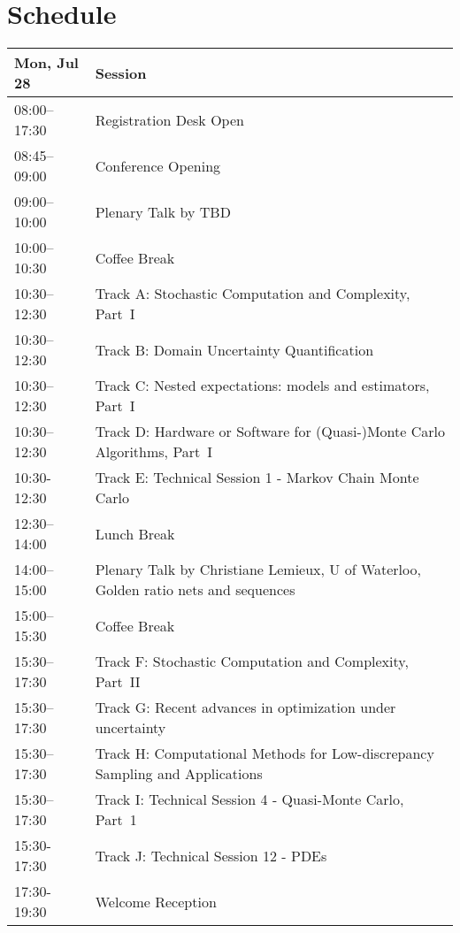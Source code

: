 \chapter{Schedule}
\begin{table}
{\footnotesize
\begin{tabularx}{\textwidth}{>{\hsize=0.32\hsize}X|>{\hsize=1.7\hsize}X}
\hline
\textbf{Mon, Jul 28} & \textbf{Session} \\
\hline
\cellcolor{\EmptyColor}08:00–17:30 & \cellcolor{\EmptyColor}Registration Desk Open \\
\cellcolor{\PlenaryColor}08:45–09:00 & \cellcolor{\PlenaryColor}Conference Opening \\
\cellcolor{\PlenaryColor}09:00–10:00 & \cellcolor{\PlenaryColor}Plenary Talk by TBD \\
\cellcolor{\EmptyColor}10:00–10:30 & \cellcolor{\EmptyColor}Coffee Break \\
\cellcolor{\SessionTitleColor}10:30–12:30 & \cellcolor{\SessionTitleColor}Track A: Stochastic Computation and Complexity, Part~I \\
\cellcolor{\SessionTitleColor}10:30–12:30 & \cellcolor{\SessionTitleColor}Track B: Domain Uncertainty Quantification \\
\cellcolor{\SessionTitleColor}10:30–12:30 & \cellcolor{\SessionTitleColor}Track C: Nested expectations: models and estimators, Part~I \\
\cellcolor{\SessionTitleColor}10:30–12:30 & \cellcolor{\SessionTitleColor}Track D: Hardware or Software for (Quasi-)Monte Carlo Algorithms, Part~I \\
\cellcolor{\SessionLightColor}10:30-12:30 & \cellcolor{\SessionLightColor}Track E: Technical Session 1 - Markov Chain Monte Carlo \\
\cellcolor{\EmptyColor}12:30–14:00 & \cellcolor{\EmptyColor}Lunch Break \\
\cellcolor{\PlenaryColor}14:00–15:00 & \cellcolor{\PlenaryColor}Plenary Talk by Christiane Lemieux, U of Waterloo, Golden ratio nets and sequences \\
\cellcolor{\EmptyColor}15:00–15:30 & \cellcolor{\EmptyColor}Coffee Break \\
\cellcolor{\SessionTitleColor}15:30–17:30 & \cellcolor{\SessionTitleColor}Track F: Stochastic Computation and Complexity, Part~II \\
\cellcolor{\SessionTitleColor}15:30–17:30 & \cellcolor{\SessionTitleColor}Track G: Recent advances in optimization under uncertainty \\
\cellcolor{\SessionTitleColor}15:30–17:30 & \cellcolor{\SessionTitleColor}Track H: Computational Methods for Low-discrepancy Sampling and Applications \\
\cellcolor{\SessionLightColor}15:30–17:30 & \cellcolor{\SessionLightColor}Track I: Technical Session 4 - Quasi-Monte Carlo, Part~1 \\
\cellcolor{\SessionLightColor}15:30-17:30 & \cellcolor{\SessionLightColor}Track J: Technical Session 12 - PDEs \\
\cellcolor{\EmptyColor}17:30-19:30 & \cellcolor{\EmptyColor}Welcome Reception \\
\hline
\end{tabularx}
}
\end{table}

